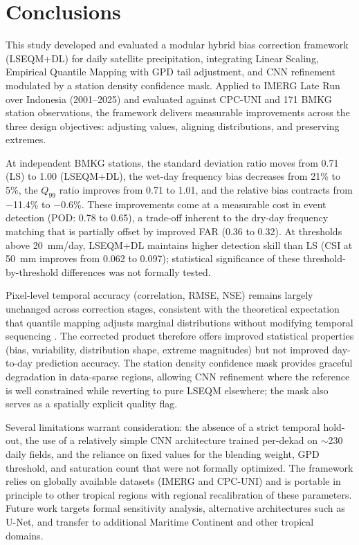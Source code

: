 \documentclass[11pt,a4paper]{article}
\begin{document}
\section{Conclusions}\label{conclusions}

This study developed and evaluated a modular hybrid bias correction
framework (LSEQM+DL) for daily satellite precipitation, integrating
Linear Scaling, Empirical Quantile Mapping with GPD tail adjustment,
and CNN refinement modulated by a station density confidence mask.
Applied to IMERG Late Run over Indonesia (2001--2025) and evaluated
against CPC-UNI and 171 BMKG station observations, the framework
delivers measurable improvements across the three design objectives:
adjusting values, aligning distributions, and preserving extremes.

At independent BMKG stations, the standard deviation ratio moves from
0.71 (LS) to 1.00 (LSEQM+DL), the wet-day frequency bias decreases from
21\% to 5\%, the \(Q_{99}\) ratio improves from 0.71 to 1.01, and the
relative bias contracts from \(-\)11.4\% to \(-\)0.6\%. These improvements
come at a measurable cost in event detection (POD: 0.78 to 0.65), a
trade-off inherent to the dry-day frequency matching \cite{ref11} that
is partially offset by improved FAR (0.36 to 0.32). At thresholds above
20~mm/day, LSEQM+DL maintains higher detection skill than LS (CSI at
50~mm improves from 0.062 to 0.097); statistical significance of these
threshold-by-threshold differences was not formally tested.

Pixel-level temporal accuracy (correlation, RMSE, NSE) remains largely
unchanged across correction stages, consistent with the theoretical
expectation that quantile mapping adjusts marginal distributions without
modifying temporal sequencing \cite{ref34}. The corrected product
therefore offers improved statistical properties (bias, variability,
distribution shape, extreme magnitudes) but not improved day-to-day
prediction accuracy. The station density confidence mask provides
graceful degradation in data-sparse regions, allowing CNN refinement
where the reference is well constrained while reverting to pure LSEQM
elsewhere; the mask also serves as a spatially explicit quality flag.

Several limitations warrant consideration: the absence of a strict
temporal hold-out, the use of a relatively simple CNN architecture
trained per-dekad on \(\sim\)230 daily fields, and the reliance on
fixed values for the blending weight, GPD threshold, and saturation
count that were not formally optimized. The framework relies on globally
available datasets (IMERG and CPC-UNI) and is portable in principle to
other tropical regions with regional recalibration of these parameters.
Future work targets formal sensitivity analysis, alternative
architectures such as U-Net, and transfer to additional Maritime
Continent and other tropical domains.
\end{document}
